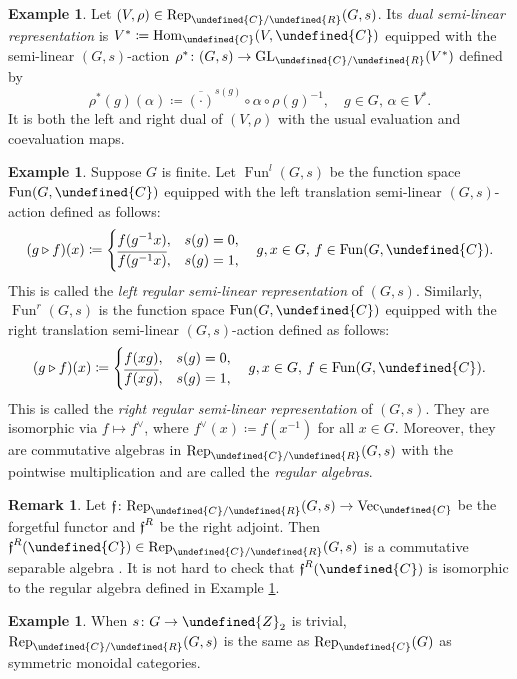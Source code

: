 \documentclass[10pt]{article}
\let\mathbb\undefined
\theoremstyle{definition}
\newtheorem{expl}[thm]{Example}
\newtheorem{rem}[thm]{Remark}
\numberwithin{equation}{section}
\numberwithin{thm}{section}
\newcommand{\Cb}{\mathbb{C}}
\newcommand{\Rb}{\mathbb{R}}
\newcommand{\Zb}{\mathbb{Z}}
\DeclareMathOperator{\Hom}{Hom}
\DeclareMathOperator{\fun}{Fun}
\newcommand{\forget}{\text{\usefont{U}{euf}{m}{n}f}}
\newcommand{\vect}{\mathrm{Vec}}
\newcommand{\rep}{\mathrm{Rep}}
\begin{document}
\begin{expl} \label{expl_dual_semi-linear_rep}
Let $(V,\rho) \in \rep_{\Cb/\Rb}(G,s)$. Its \emph{dual semi-linear representation} is $V^* \coloneqq \Hom_\Cb(V,\Cb)$ equipped with the semi-linear $(G,s)$-action $\rho^* \colon (G,s) \to \mathrm{GL}_{\Cb/\Rb}(V^*)$ defined by
\[
\rho^*(g)(\alpha) \coloneqq \overline{(\cdot)}^{s(g)} \circ \alpha \circ \rho(g)^{-1} , \quad g \in G , \, \alpha \in V^* .
\]
It is both the left and right dual of $(V,\rho)$ with the usual evaluation and coevaluation maps.
\end{expl}

\begin{expl} \label{expl_regular_rep}
Suppose $G$ is finite. Let $\fun^l(G,s)$ be the function space $\fun(G,\Cb)$ equipped with the left translation semi-linear $(G,s)$-action defined as follows:
\[
(g \triangleright f)(x) \coloneqq \begin{cases}
f(g^{-1}x) , & s(g) = 0 , \\
\overline{f(g^{-1}x)} , & s(g) = 1 ,
\end{cases} \quad g,x \in G , \, f \in \fun(G,\Cb) .
\]
This is called the \emph{left regular semi-linear representation} of $(G,s)$. Similarly, $\fun^r(G,s)$ is the function space $\fun(G,\Cb)$ equipped with the right translation semi-linear $(G,s)$-action defined as follows:
\[
(g \triangleright f)(x) \coloneqq \begin{cases}
f(xg) , & s(g) = 0 , \\
\overline{f(xg)} , & s(g) = 1 ,
\end{cases} \quad g,x \in G , \, f \in \fun(G,\Cb) .
\]
This is called the \emph{right regular semi-linear representation} of $(G,s)$. They are isomorphic via $f \mapsto f^\vee$, where $f^\vee(x) \coloneqq f(x^{-1})$ for all $x \in G$. Moreover, they are commutative algebras in $\rep_{\Cb/\Rb}(G,s)$ with the pointwise multiplication and are called the \emph{regular algebras}.
\end{expl}

\begin{rem}
Let $\forget \colon \rep_{\Cb/\Rb}(G,s) \to \vect_\Cb$ be the forgetful functor and $\forget^R$ be the right adjoint. Then $\forget^R(\Cb) \in \rep_{\Cb/\Rb}(G,s)$ is a commutative separable algebra \cite[Lemma 3.5]{DMNO13}. It is not hard to check that $\forget^R(\Cb)$ is isomorphic to the regular algebra defined in Example \ref{expl_regular_rep}.
\end{rem}

\begin{expl}
When $s \colon G \to \Zb_2$ is trivial, $\rep_{\Cb/\Rb}(G,s)$ is the same as $\rep_\Cb(G)$ as symmetric monoidal categories.
\end{expl}
\end{document}

